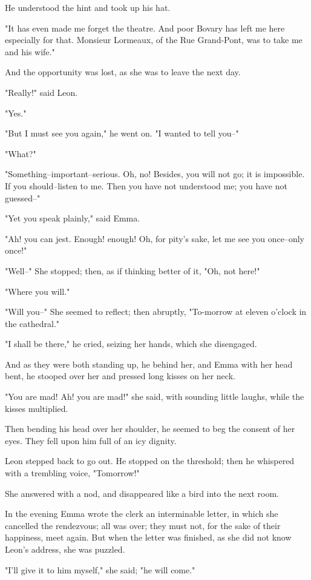 \documentclass{tufte-book}
\begin{document}
He understood the hint and took up his hat.

"It has even made me forget the theatre. And poor Bovary has left me
here especially for that. Monsieur Lormeaux, of the Rue Grand-Pont, was
to take me and his wife."

And the opportunity was lost, as she was to leave the next day.

"Really!" said Leon.

"Yes."

"But I must see you again," he went on. "I wanted to tell you--"

"What?"

"Something--important--serious. Oh, no! Besides, you will not go; it is
impossible. If you should--listen to me. Then you have not understood
me; you have not guessed--"

"Yet you speak plainly," said Emma.

"Ah! you can jest. Enough! enough! Oh, for pity's sake, let me see you
once--only once!"

"Well--" She stopped; then, as if thinking better of it, "Oh, not here!"

"Where you will."

"Will you--" She seemed to reflect; then abruptly, "To-morrow at eleven
o'clock in the cathedral."

"I shall be there," he cried, seizing her hands, which she disengaged.

And as they were both standing up, he behind her, and Emma with her head
bent, he stooped over her and pressed long kisses on her neck.

"You are mad! Ah! you are mad!" she said, with sounding little laughs,
while the kisses multiplied.

Then bending his head over her shoulder, he seemed to beg the consent of
her eyes. They fell upon him full of an icy dignity.

Leon stepped back to go out. He stopped on the threshold; then he
whispered with a trembling voice, "Tomorrow!"

She answered with a nod, and disappeared like a bird into the next room.

In the evening Emma wrote the clerk an interminable letter, in which she
cancelled the rendezvous; all was over; they must not, for the sake of
their happiness, meet again. But when the letter was finished, as she
did not know Leon's address, she was puzzled.

"I'll give it to him myself," she said; "he will come."
\end{document}
